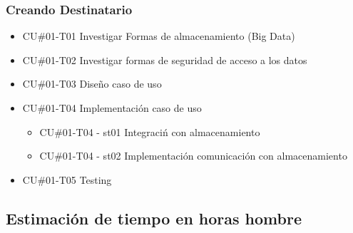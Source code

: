 \documentclass[a4paper, 11pt]{article}
\begin{document}
\subsubsection{Creando Destinatario}
\begin{itemize}
\item{CU\#01-T01} Investigar Formas de almacenamiento (Big Data)
\item{CU\#01-T02} Investigar formas de seguridad de acceso a los datos
\item{CU\#01-T03} Dise\~no caso de uso
\item{CU\#01-T04} Implementaci\'on caso de uso
\begin{itemize}
\item{CU\#01-T04 - st01} Integraci\'n con almacenamiento
\item{CU\#01-T04 - st02} Implementaci\'on comunicaci\'on con almacenamiento
\end{itemize}
\item{CU\#01-T05} Testing
\end{itemize}


\subsection{Estimaci\'on de tiempo en horas hombre}

\end{document}
